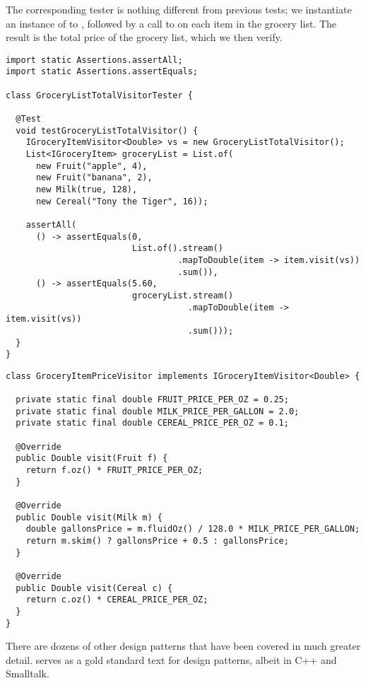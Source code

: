 The corresponding tester is nothing different from previous tests; we instantiate an instance of  to , followed by a call to  on each item in the grocery list. 
The result is the total price of the grocery list, which we then verify.

\begin{lstlisting}[language=MyJava]
import static Assertions.assertAll;
import static Assertions.assertEquals;

class GroceryListTotalVisitorTester {

  @Test
  void testGroceryListTotalVisitor() {
    IGroceryItemVisitor<Double> vs = new GroceryListTotalVisitor();
    List<IGroceryItem> groceryList = List.of(
      new Fruit("apple", 4),
      new Fruit("banana", 2),
      new Milk(true, 128),
      new Cereal("Tony the Tiger", 16));

    assertAll(
      () -> assertEquals(0, 
                         List.of().stream()
                                  .mapToDouble(item -> item.visit(vs))
                                  .sum()),
      () -> assertEquals(5.60, 
                         groceryList.stream()
                                    .mapToDouble(item -> item.visit(vs))
                                    .sum()));
  }
}
\end{lstlisting}

\begin{lstlisting}[language=MyJava]
class GroceryItemPriceVisitor implements IGroceryItemVisitor<Double> {

  private static final double FRUIT_PRICE_PER_OZ = 0.25;
  private static final double MILK_PRICE_PER_GALLON = 2.0;
  private static final double CEREAL_PRICE_PER_OZ = 0.1;

  @Override
  public Double visit(Fruit f) {
    return f.oz() * FRUIT_PRICE_PER_OZ;
  }

  @Override
  public Double visit(Milk m) {
    double gallonsPrice = m.fluidOz() / 128.0 * MILK_PRICE_PER_GALLON;
    return m.skim() ? gallonsPrice + 0.5 : gallonsPrice;
  }

  @Override
  public Double visit(Cereal c) {
    return c.oz() * CEREAL_PRICE_PER_OZ;
  }
}
\end{lstlisting}

There are dozens of other design patterns that have been covered in much greater detail.
 serves as a gold standard text for design patterns, albeit in C++ and Smalltalk.
